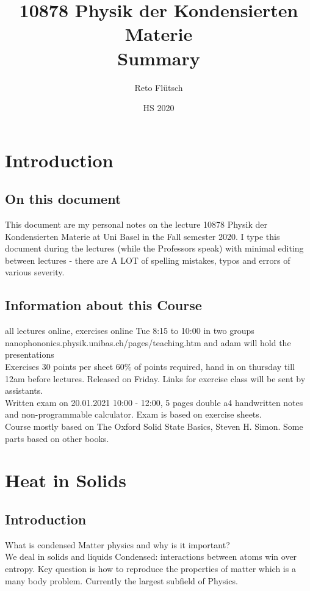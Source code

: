 \documentclass{report}
\title{10878 Physik der Kondensierten Materie\\
        \large Summary
        }
\author{Reto Flütsch}
\date{HS 2020}
\begin{document}
\maketitle
    
\chapter*{Introduction}
\section*{On this document}
This document are my personal notes on the lecture 10878 Physik der Kondensierten Materie at Uni Basel in the Fall semester 2020. I type this document during the lectures (while the Professors speak) with minimal editing between lectures - there are A LOT of spelling mistakes, typos and errors of various severity.
\section*{Information about this Course}
all lectures online, exercises online Tue 8:15 to 10:00 in two groups\\
nanophononics.physik.unibas.ch/pages/teaching.htm and adam will hold the presentations\\
Exercises 30 points per sheet 60\% of points required, hand in on thursday till 12am before lectures. Released on Friday. Links for exercise class will be sent by assistants.\\

Written exam on 20.01.2021 10:00 - 12:00, 5 pages double a4 handwritten notes and non-programmable calculator. Exam is based on exercise sheets. \\

Course mostly based on The Oxford Solid State Basics, Steven H. Simon. Some parts based on other books.


\tableofcontents
\newpage
\chapter{Heat in Solids}
\section{Introduction}
What is condensed Matter physics and why is it important? \\
We deal in solids and liquids Condensed: interactions between atoms win over entropy. Key question is how to reproduce the properties of matter which is a many body problem. Currently the largest subfield of Physics.\\
\end{document}
